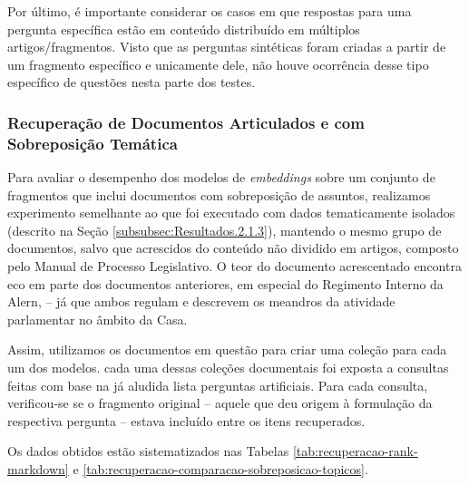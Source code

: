 Por último, é importante considerar os casos em que respostas para uma pergunta específica estão em conteúdo distribuído em múltiplos artigos/fragmentos. Visto que as perguntas sintéticas foram criadas a partir de um fragmento específico e unicamente dele, não houve ocorrência desse tipo específico de questões nesta parte dos testes.

\subsubsection{Recuperação de Documentos Articulados e com Sobreposição Temática}
\label{subsubsec:Resultados.2.1.4}

Para avaliar o desempenho dos modelos de \textit{embeddings} sobre um conjunto de fragmentos que inclui documentos com sobreposição de assuntos, realizamos experimento semelhante ao que foi executado com dados tematicamente isolados (descrito na Seção \ref{subsubsec:Resultados.2.1.3}), mantendo o mesmo grupo de documentos, salvo que acrescidos do conteúdo não dividido em artigos, composto pelo Manual de Processo Legislativo. O teor do documento acrescentado encontra eco em parte dos documentos anteriores, em especial do Regimento Interno da Alern, -- já que ambos regulam e descrevem os meandros da atividade parlamentar no âmbito da Casa.

Assim, utilizamos os documentos em questão para criar uma coleção para cada um dos modelos. cada uma dessas coleções documentais foi exposta a consultas feitas com base na já aludida lista perguntas artificiais. Para cada consulta, verificou-se se o fragmento original -- aquele que deu origem à formulação da respectiva pergunta -- estava incluído entre os itens recuperados.

Os dados obtidos estão sistematizados nas Tabelas \ref{tab:recuperacao-rank-markdown} e \ref{tab:recuperacao-comparacao-sobreposicao-topicos}.

